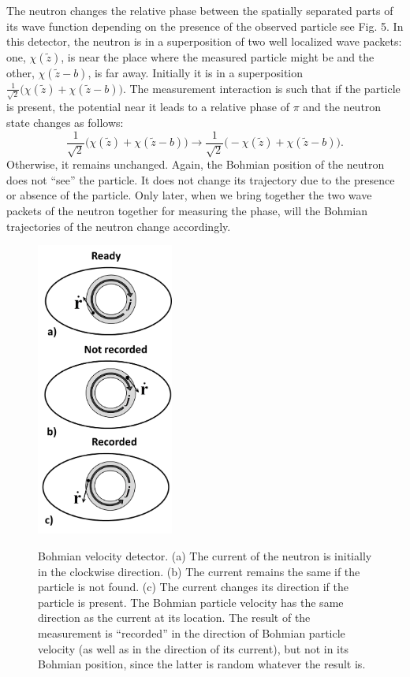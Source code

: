 \documentclass[preprint,tightenlines]{elsarticle}
\begin{document}
The neutron changes the relative
phase between the spatially separated parts of its wave function depending
on the presence of the observed particle see Fig. 5. In this detector, the neutron
is in a superposition of two well localized wave packets: one, $\chi(\tilde{z})$,
is near the place where the measured particle might be and the other,
$\chi(\tilde{z}-b)$, is  far away. Initially it is in
a superposition $\frac{1}{\sqrt{2}} \Big(\chi(\tilde{z})+\chi(\tilde{z}-b) \Big)$.
The measurement interaction is such that if the particle is present,
the potential near it leads to a relative phase of $\pi$ and the
neutron state changes as follows:
 \begin{equation}
\frac{1}{\sqrt{2}}\Big(\chi(\tilde{z})+\chi(\tilde{z}-b)\Big ) \rightarrow \frac{1}{\sqrt{2}}\Big(-\chi(\tilde{z})+\chi(\tilde{z}-b)\Big ).\label{phasedet}\end{equation}
 Otherwise, it remains unchanged. Again, the Bohmian position of the
neutron does not ``see'' the particle. It does not change its
trajectory due to the presence or absence of the particle. Only later,
when we bring together the two wave packets of the neutron together
for measuring the phase, will the Bohmian trajectories of the neutron
change accordingly.


\begin{figure}[H]
  \includegraphics[width=4.5cm]{6.pdf}\\ \vspace{-6pt}
    \caption{ Bohmian velocity detector. (a) The current of the neutron is initially in the clockwise direction. (b) The current remains the same if the particle is not found. (c) The current changes its direction if the particle is present.  The Bohmian particle  velocity  has the same direction as the current at its location. The result of the measurement is ``recorded'' in the direction of Bohmian particle velocity (as well as in the direction of its current), but not in its Bohmian position, since the latter is random whatever the result is.}
\end{figure}
\end{document}
